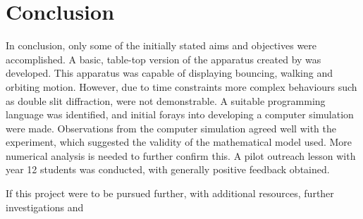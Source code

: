 \section{Conclusion}



In conclusion, only some of the initially stated aims and objectives were accomplished. A basic, table-top version of the apparatus created by \cite{couder} was developed. This apparatus was capable of displaying bouncing, walking and orbiting motion. However, due to time constraints more complex behaviours such as double slit diffraction, were not demonstrable. A suitable programming language was identified, and initial forays into developing a computer simulation were made. Observations from the computer simulation agreed well with the experiment, which suggested the validity of the mathematical model used. More numerical analysis is needed to further confirm this. A pilot outreach lesson with year 12 students was conducted, with generally positive feedback obtained. 

If this project were to be pursued further, with additional resources, further investigations and 